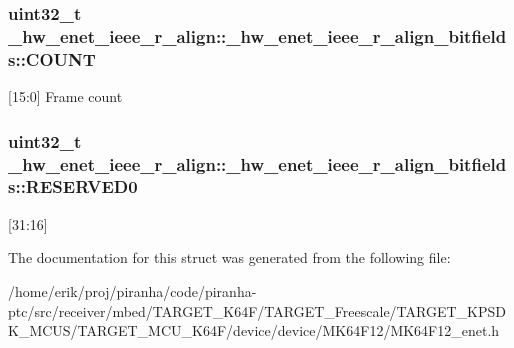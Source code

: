 \subsubsection[{\texorpdfstring{C\+O\+U\+NT}{COUNT}}]{\setlength{\rightskip}{0pt plus 5cm}uint32\+\_\+t \+\_\+hw\+\_\+enet\+\_\+ieee\+\_\+r\+\_\+align\+::\+\_\+hw\+\_\+enet\+\_\+ieee\+\_\+r\+\_\+align\+\_\+bitfields\+::\+C\+O\+U\+NT}\hypertarget{struct__hw__enet__ieee__r__align_1_1__hw__enet__ieee__r__align__bitfields_a2947425c155903e5b035f4c95b0f8c96}{}\label{struct__hw__enet__ieee__r__align_1_1__hw__enet__ieee__r__align__bitfields_a2947425c155903e5b035f4c95b0f8c96}
\mbox{[}15\+:0\mbox{]} Frame count 
\subsubsection[{\texorpdfstring{R\+E\+S\+E\+R\+V\+E\+D0}{RESERVED0}}]{\setlength{\rightskip}{0pt plus 5cm}uint32\+\_\+t \+\_\+hw\+\_\+enet\+\_\+ieee\+\_\+r\+\_\+align\+::\+\_\+hw\+\_\+enet\+\_\+ieee\+\_\+r\+\_\+align\+\_\+bitfields\+::\+R\+E\+S\+E\+R\+V\+E\+D0}\hypertarget{struct__hw__enet__ieee__r__align_1_1__hw__enet__ieee__r__align__bitfields_a8175ae1fbbf331b3658561be03613c29}{}\label{struct__hw__enet__ieee__r__align_1_1__hw__enet__ieee__r__align__bitfields_a8175ae1fbbf331b3658561be03613c29}
\mbox{[}31\+:16\mbox{]} 

The documentation for this struct was generated from the following file\+:\begin{DoxyCompactItemize}
\item 
/home/erik/proj/piranha/code/piranha-\/ptc/src/receiver/mbed/\+T\+A\+R\+G\+E\+T\+\_\+\+K64\+F/\+T\+A\+R\+G\+E\+T\+\_\+\+Freescale/\+T\+A\+R\+G\+E\+T\+\_\+\+K\+P\+S\+D\+K\+\_\+\+M\+C\+U\+S/\+T\+A\+R\+G\+E\+T\+\_\+\+M\+C\+U\+\_\+\+K64\+F/device/device/\+M\+K64\+F12/M\+K64\+F12\+\_\+enet.\+h\end{DoxyCompactItemize}
